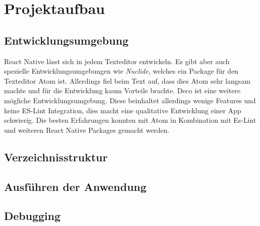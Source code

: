 \section{Projektaufbau}

\subsection{Entwicklungsumgebung}
React Native lässt sich in jedem Texteditor entwickeln. Es gibt aber auch spezielle Entwicklungsumgebungen wie \textit{Nuclide}, welches ein Package für den Texteditor Atom ist. Allerdings fiel beim Text auf, dass dies Atom sehr langsam machte und für die Entwicklung kaum Vorteile brachte. Deco ist eine weitere mögliche Entwicklungsumgebung. Diese beinhaltet allerdings wenige Features und keine ES-Lint Integration, dies macht eine qualitative Entwicklung einer App schwierig. Die besten Erfahrungen konnten mit Atom in Kombination mit Es-Lint und weiteren React Native Packages gemacht werden. 

\subsection{Verzeichnisstruktur}

\subsection{Ausführen der Anwendung}

\subsection{Debugging}